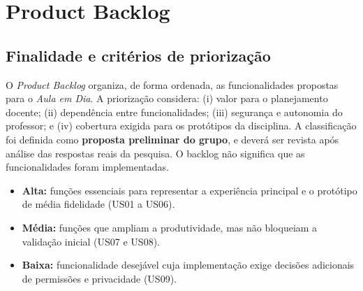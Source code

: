 \documentclass[12pt,a4paper,oneside]{report}
\begin{document}
\section{Product Backlog}
\label{sec:backlog}

\subsection{Finalidade e critérios de priorização}
O \textit{Product Backlog} organiza, de forma ordenada, as funcionalidades propostas para o \textit{Aula em Dia}. A priorização considera: (i) valor para o planejamento docente; (ii) dependência entre funcionalidades; (iii) segurança e autonomia do professor; e (iv) cobertura exigida para os protótipos da disciplina. A classificação foi definida como \textbf{proposta preliminar do grupo}, e deverá ser revista após análise das respostas reais da pesquisa. O backlog não significa que as funcionalidades foram implementadas.

\begin{itemize}[leftmargin=*]
\item \textbf{Alta:} funções essenciais para representar a experiência principal e o protótipo de média fidelidade (US01 a US06).
\item \textbf{Média:} funções que ampliam a produtividade, mas não bloqueiam a validação inicial (US07 e US08).
\item \textbf{Baixa:} funcionalidade desejável cuja implementação exige decisões adicionais de permissões e privacidade (US09).
\end{itemize}
\end{document}
